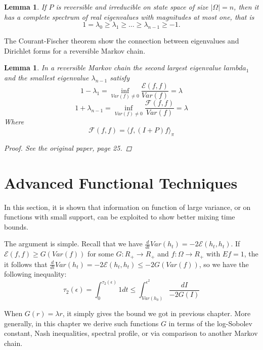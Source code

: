 \documentclass[12pt,reqno]{amsart}
\newtheorem{lem}[thm]{Lemma}
\begin{document}
\begin{lem}
  If $P$ is reversible and irreducible on state space of size $|\Omega|=n$, then it has a complete spectrum of real eigenvalues with magnitudes at most one, that is
  \begin{equation}
    \label{eq:eigenvalue}
    1 = \lambda_0 \geq \lambda_1 \geq \ldots \geq \lambda_{n-1} \geq -1.
  \end{equation}
\end{lem}

The Courant-Fischer theorem show the connection between eigenvalues and 
Dirichlet forms for a reversible Markov chain.

\begin{lem}
  In a reversible Markov chain the second largest eigenvalue $lambda_1$ and the smallest 
eigenvalue $\lambda_{n-1}$ satisfy
\begin{equation}
  1 - \lambda_1 = \inf_{Var(f)\neq 0}\frac{\mathcal{E}(f,f)}{Var(f)} = \lambda
\end{equation}
\begin{equation}
  1 + \lambda_{n-1} = \inf_{Var(f)\neq 0}\frac{\mathcal{F}(f,f)}{Var(f)} = \lambda
\end{equation}
Where 
$$\mathcal{F}(f,f) = \langle f,(I+P)f\rangle_{\pi}$$
\begin{proof}
  See the original paper, page 25.
\end{proof}
\end{lem}

\section{Advanced Functional Techniques}
In this section, it is shown that information on function of large variance, or on functions with small support, can be exploited to show better mixing time bounds.

The argument is simple. Recall that we have $\frac{d}{dt}Var(h_t)=-2\mathcal{E}(h_t,h_t)$. If 
$\mathcal{E}(f,f)\geq G(Var(f))$ for some $G : R_+\rightarrow R_+$ and $f : \Omega \rightarrow R_+$ with $Ef=1$, the it follows that $\frac{d}{dt}Var(h_t)=-2\mathcal{E}(h_t,h_t)\leq -2 G(Var(f)) $, so we have the following inequality:
\begin{equation}
  \label{eq:inte_ineq}
  \tau_2(\epsilon) = \int_0^{\tau_2(\epsilon)}1dt \leq \int_{Var(h_0)}^{\epsilon^2}\frac{dI}{-2G(I)}
\end{equation}

When $G(r) = \lambda r$, it simply gives the bound we got in previous chapter. More generally, in this chapter we derive such functions $G$ in terms of the log-Sobolev constant, Nash inequalities, spectral profile, or via comparison to another Markov chain.
\end{document}
